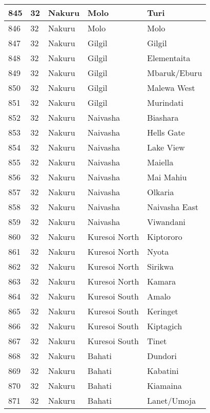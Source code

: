 \begin{table}[!ht]
\begin{tabular}{|l|l|l|l|l|}
        845 & 32 & Nakuru & Molo & Turi \\ \hline
        846 & 32 & Nakuru & Molo & Molo \\ \hline
        847 & 32 & Nakuru & Gilgil & Gilgil \\ \hline
        848 & 32 & Nakuru & Gilgil & Elementaita \\ \hline
        849 & 32 & Nakuru & Gilgil & Mbaruk/Eburu \\ \hline
        850 & 32 & Nakuru & Gilgil & Malewa West \\ \hline
        851 & 32 & Nakuru & Gilgil & Murindati \\ \hline
        852 & 32 & Nakuru & Naivasha & Biashara \\ \hline
        853 & 32 & Nakuru & Naivasha & Hells Gate \\ \hline
        854 & 32 & Nakuru & Naivasha & Lake View \\ \hline
        855 & 32 & Nakuru & Naivasha & Maiella \\ \hline
        856 & 32 & Nakuru & Naivasha & Mai Mahiu \\ \hline
        857 & 32 & Nakuru & Naivasha & Olkaria \\ \hline
        858 & 32 & Nakuru & Naivasha & Naivasha East \\ \hline
        859 & 32 & Nakuru & Naivasha & Viwandani \\ \hline
        860 & 32 & Nakuru & Kuresoi North & Kiptororo \\ \hline
        861 & 32 & Nakuru & Kuresoi North & Nyota \\ \hline
        862 & 32 & Nakuru & Kuresoi North & Sirikwa \\ \hline
        863 & 32 & Nakuru & Kuresoi North & Kamara \\ \hline
        864 & 32 & Nakuru & Kuresoi South & Amalo \\ \hline
        865 & 32 & Nakuru & Kuresoi South & Keringet \\ \hline
        866 & 32 & Nakuru & Kuresoi South & Kiptagich \\ \hline
        867 & 32 & Nakuru & Kuresoi South & Tinet \\ \hline
        868 & 32 & Nakuru & Bahati & Dundori \\ \hline
        869 & 32 & Nakuru & Bahati & Kabatini \\ \hline
        870 & 32 & Nakuru & Bahati & Kiamaina \\ \hline
        871 & 32 & Nakuru & Bahati & Lanet/Umoja \\ \hline

\end{tabular}
\end{table}
